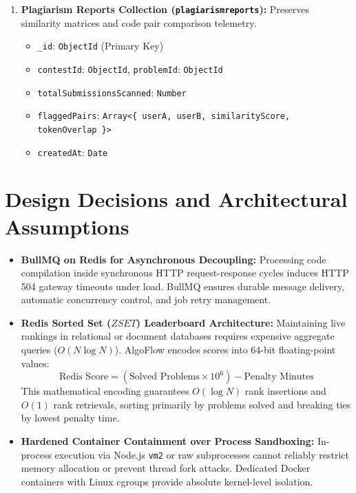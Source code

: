 \documentclass[12pt,a4paper]{report}
\begin{document}
\begin{enumerate}[leftmargin=*, label=\bfseries\arabic*.]
  \item \textbf{Plagiarism Reports Collection (\texttt{plagiarismreports}):} Preserves similarity matrices and code pair comparison telemetry.
  \begin{itemize}
    \item \texttt{\_id}: \texttt{ObjectId} (Primary Key)
    \item \texttt{contestId}: \texttt{ObjectId}, \texttt{problemId}: \texttt{ObjectId}
    \item \texttt{totalSubmissionsScanned}: \texttt{Number}
    \item \texttt{flaggedPairs}: \texttt{Array<\{ userA, userB, similarityScore, tokenOverlap \}>}
    \item \texttt{createdAt}: \texttt{Date}
  \end{itemize}
\end{enumerate}

\section{Design Decisions and Architectural Assumptions}
\begin{itemize}[leftmargin=*]
  \item \textbf{BullMQ on Redis for Asynchronous Decoupling:} Processing code compilation inside synchronous HTTP request-response cycles induces HTTP 504 gateway timeouts under load. BullMQ ensures durable message delivery, automatic concurrency control, and job retry management.
  \item \textbf{Redis Sorted Set ($ZSET$) Leaderboard Architecture:} Maintaining live rankings in relational or document databases requires expensive aggregate queries ($O(N \log N)$). AlgoFlow encodes scores into 64-bit floating-point values:
  $$\text{Redis Score} = (\text{Solved Problems} \times 10^6) - \text{Penalty Minutes}$$
  This mathematical encoding guarantees $O(\log N)$ rank insertions and $O(1)$ rank retrievals, sorting primarily by problems solved and breaking ties by lowest penalty time.
  \item \textbf{Hardened Container Containment over Process Sandboxing:} In-process execution via Node.js \texttt{vm2} or raw subprocesses cannot reliably restrict memory allocation or prevent thread fork attacks. Dedicated Docker containers with Linux cgroups provide absolute kernel-level isolation.
\end{itemize}

\clearpage

\end{document}
